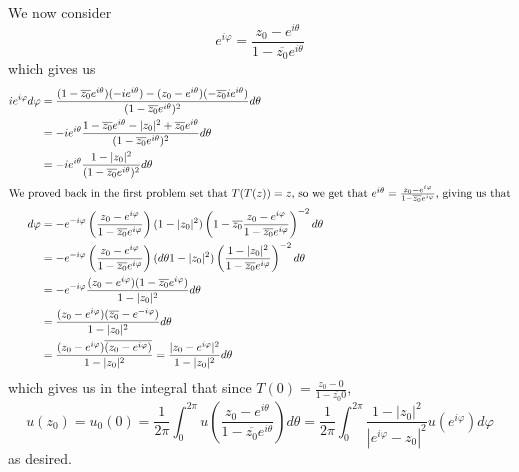 \documentclass[12pt,letterpaper]{article}
\theoremstyle{definition}
\begin{document}
We now consider
\[
  e^{i\varphi} = \frac{z_{0}-e^{i\theta}}{1-\overline{z_{0}}e^{i\theta}}
\]
which gives us
\begin{align*}
  ie^{i\varphi}d\varphi &= \frac{(1-\overline{z_{0}}e^{i\theta})(-ie^{i\theta}) - (z_{0} - e^{i\theta})(-\overline{z_{0}}ie^{i\theta})}{(1-\overline{z_{0}}e^{i\theta})^{2}}d\theta \\
                        &= -ie^{i\theta}\frac{1 - \overline{z_{0}}e^{i\theta} - |z_{0}|^{2} + \overline{z_{0}}e^{i\theta}}{(1-\overline{z_{0}}e^{i\theta})^{2}}d\theta \\
                        &= -ie^{i\theta} \frac{1 - |z_{0}|^{2}}{(1-\overline{z_{0}}e^{i\theta})^{2}}d\theta \\
  \intertext{We proved back in the first problem set that $T(T(z)) = z$, so we get that $e^{i\theta} = \frac{z_{0} - e^{i\varphi}}{1 - \overline{z_{0}}e^{i\varphi}}$, giving us that}
  d\varphi &= -e^{-i\varphi}\left(\frac{z_{0} - e^{i\varphi}}{1 - \overline{z_{0}}e^{i\varphi}}\right)(1-|z_{0}|^{2})\left(1 - \overline{z_{0}}\frac{z_{0} - e^{i\varphi}}{1 - \overline{z_{0}}e^{i\varphi}}\right)^{-2} d\theta\\
                        &= -e^{-i\varphi}\left(\frac{z_{0} - e^{i\varphi}}{1 - \overline{z_{0}}e^{i\varphi}}\right)(d\theta1-|z_{0}|^{2})\left(\frac{1-|z_{0}|^{2}}{1 - \overline{z_{0}}e^{i\varphi}}\right)^{-2} d\theta\\
                        &= -e^{-i\varphi}\frac{(z_{0}-e^{i\varphi})(1-\overline{z_{0}}e^{i\varphi})}{1-|z_{0}|^{2}} d\theta\\
                        &= \frac{(z_{0}-e^{i\varphi})(\overline{z_{0}}-e^{-i\varphi})}{1-|z_{0}|^{2}} d\theta\\
                        &= \frac{(z_{0}-e^{i\varphi})\overline{(z_{0}-e^{i\varphi})}}{1-|z_{0}|^{2}} = \frac{|z_{0} - e^{i\varphi}|^{2}}{1 - |z_{0}|^{2}}d\theta
\end{align*}
which gives us in the integral that since $T(0) = \frac{z_{0} - 0}{1 - \overline{z_{0}}0}$,
\[
  u(z_{0}) = u_{0}(0) = \frac{1}{2\pi}\int_{0}^{2\pi}u\left(\frac{z_{0}-e^{i\theta}}{1-\overline{z_{0}}e^{i\theta}}\right)d\theta = \frac{1}{2\pi}\int_{0}^{2\pi}\frac{1 - |z_{0}|^{2}}{|e^{i\varphi}-z_{0}|^{2}}u(e^{i\varphi})d\varphi
\]
as desired.
\end{document}

